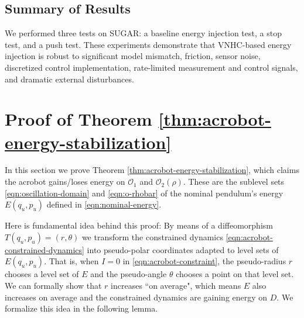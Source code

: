 \documentclass[journal,twoside,web, twocolumn,draftcls]{ieeecolor}
\newcommand*{\R}{\mathbb{R}}
\newcommand*{\Sone}{\mathbb{S}^1}
\newcommand*{\SxR}{\Sone \times \R}
\newcommand*{\etal}{\MakeLowercase{\textit{et al.~}}}
\begin{document}
\subsection{Summary of Results} 
We performed three tests on SUGAR: a baseline energy injection test,
a stop test, and a push test.
These experiments demonstrate that VNHC-based energy injection is robust to
significant model mismatch, friction, sensor noise, discretized control
implementation, rate-limited measurement and control signals, and dramatic
external disturbances.

\section{Proof of Theorem \ref{thm:acrobot-energy-stabilization}}\label{sec:proof}
In this section we prove Theorem \ref{thm:acrobot-energy-stabilization},
which claims the acrobot gains/loses energy on \(\mathcal{O}_1\) and
\(\mathcal{O}_2(\rho)\).
These are the sublevel sets \eqref{eqn:oscillation-domain} and
\eqref{eqn:o-rhobar} of the nominal pendulum's energy \(E(q_u,p_u)\) defined in
\eqref{eqn:nominal-energy}.

Here is fundamental idea behind this proof:
By means of a diffeomorphism \(T(q_u,p_u) = (r,\theta)\) we transform the
constrained dynamics \eqref{eqn:acrobot-constrained-dynamics} 
into pseudo-polar coordinates adapted to level sets of \(E(q_u,p_u)\).
That is, when \(I = 0\) in \eqref{eqn:acrobot-constraint}, the pseudo-radius
\(r\) chooses a level set of \(E\) and the pseudo-angle \(\theta\) chooses a
point on that level set.
We can formally show that \(r\) increases ``on average", which means \(E\)
also increases on average and the constrained dynamics are gaining energy on
\(D\).
We formalize this idea in the following lemma.

\end{document}

